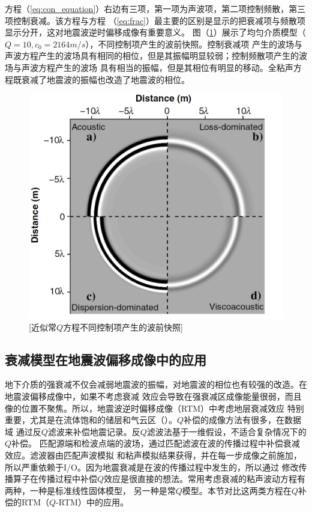 方程（\ref{eq:con_equation}）右边有三项，第一项为声波项，第二项控制频散，第三项控制衰减。该方程与方程
（\ref{eq:frac}）最主要的区别是显示的把衰减项与频散项显示分开，这对地震波逆时偏移成像有重要意义。
图（\ref{fig:wave_frac}）展示了均匀介质模型（$Q=10,c_0=2164m/s$），不同控制项产生的波前快照。控制衰减项
产生的波场与声波方程产生的波场具有相同的相位，但是其振幅明显较弱；控制频散项产生的波场与声波方程产生的波场
具有相当的振幅，但是其相位有明显的移动。全粘声方程既衰减了地震波的振幅也改造了地震波的相位。
\begin{figure}[!htbp]
	    \centering
		\includegraphics[width=0.7\linewidth]{figure/wave_frac}
		[近似常$Q$方程不同控制项产生的波前快照]
		\label{fig:wave_frac}
\end{figure}


\vspace{0.5cm}
\subsection{衰减模型在地震波偏移成像中的应用}
地下介质的强衰减不仅会减弱地震波的振幅，对地震波的相位也有较强的改造。在地震波偏移成像中，如果不考虑衰减
效应会导致在强衰减区成像能量很弱，而且像的位置不聚焦。所以，地震波逆时偏移成像（RTM）中考虑地层衰减效应
特别重要，尤其是在流体饱和的储层和气云区（）。$Q$补偿的成像方法有很多，在数据域
通过反$Q$滤波来补偿地震记录。反$Q$滤波法基于一维假设，不适合复杂情况下的$Q$补偿。
匹配源端和检波点端的波场，通过匹配滤波在波的传播过程中补偿衰减效应。滤波器由匹配声波模拟
和粘声模拟结果获得，并在每一步成像之前施加，所以严重依赖于I/O。因为地震衰减是在波的传播过程中发生的，所以通过
修改传播算子在传播过程中补偿$Q$效应是很直接的想法。常用考虑衰减的粘声波动方程有两种，一种是标准线性固体模型，
另一种是常$Q$模型。本节对比这两类方程在$Q$补偿的RTM（$Q$-RTM）中的应用。

